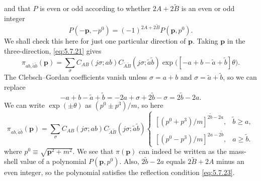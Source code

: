 and that $P$ is even or odd according to whether
$2A+2\widetilde B$ is an even or odd integer
\begin{equation}
P(-\mathbf p,-p^0)=(-1)^{2A+2\widetilde B}P(\mathbf p,p^0).
\tag{5.7.23}\label{eq:5.7.23}
\end{equation}
We shall check this here for just one particular direction of $\mathbf p$.
Taking $\mathbf p$ in the three-direction, \eqref{eq:5.7.21} gives
\[
\pi_{ab,\tilde a\tilde b}(\mathbf p)=\sum_\sigma
C_{AB}(j\sigma;ab)C_{\widetilde A\widetilde B}
(j\sigma;\tilde a\tilde b)
\exp\bigl([-a+b-\tilde a+\tilde b]\theta\bigr).
\]
The Clebsch--Gordan coefficients vanish unless $\sigma=a+b$ and
$\sigma=\tilde a+\tilde b$, so we can replace
\[
-a+b-\tilde a+\tilde b=-2a+\sigma+2\tilde b-\sigma=2\tilde b-2a.
\]
We can write $\exp(\pm\theta)$ as $(p^0\pm p^3)/m$, so here
\[
\pi_{ab,\tilde a\tilde b}(\mathbf p)=\sum_\sigma
C_{AB}(j\sigma;ab)C_{\widetilde A\widetilde B}
(j\sigma;\tilde a\tilde b)
\begin{cases}
[(p^0+p^3)/m]^{2\tilde b-2a},&\tilde b\geq a,\\
[(p^0-p^3)/m]^{2a-2\tilde b},&a\geq\tilde b.
\end{cases}
\]
where $p^0\equiv\sqrt{\mathbf p^2+m^2}$. We see that $\pi(\mathbf p)$ can
indeed be written as the mass-shell value of a polynomial $P(\mathbf p,p^0)$.
Also, $2\tilde b-2a$ equals $2\widetilde B+2A$ minus an even integer, so the
polynomial satisfies the reflection condition \eqref{eq:5.7.23}.

